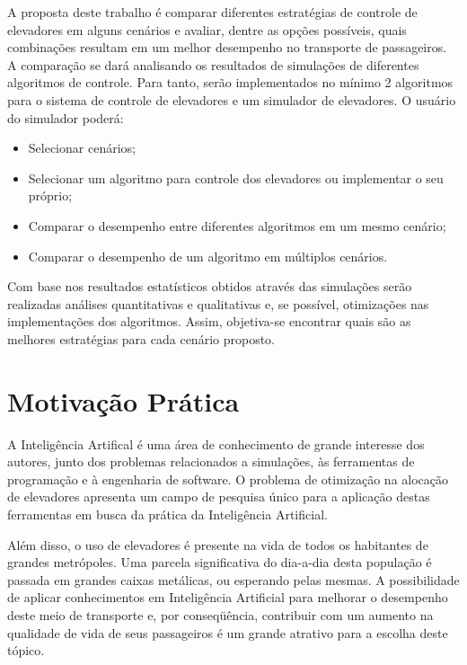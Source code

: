 {\color{red}A proposta deste trabalho é comparar diferentes estratégias de controle de elevadores em alguns cenários e avaliar, dentre as opções possíveis, quais combinações resultam em um melhor desempenho no transporte de passageiros. A comparação se dará analisando os resultados de simulações de diferentes algoritmos de controle. Para tanto, serão implementados no mínimo 2 algoritmos para o sistema de controle de elevadores e um simulador de elevadores. O usuário do simulador poderá:

\begin{itemize}
  \item Selecionar cenários;
  \item Selecionar um algoritmo para controle dos elevadores ou implementar o seu próprio;
  \item Comparar o desempenho entre diferentes algoritmos em um mesmo cenário;
  \item Comparar o desempenho de um algoritmo em múltiplos cenários.
\end{itemize}

Com base nos resultados estatísticos obtidos através das simulações serão realizadas análises quantitativas e qualitativas e, se possível, otimizações nas implementações dos algoritmos. Assim, objetiva-se encontrar quais são as melhores estratégias para cada cenário proposto.}

\section{Motivação Prática}

A Inteligência Artifical é uma área de conhecimento de grande interesse dos autores, junto dos problemas relacionados a simulações, às ferramentas de programação e à engenharia de software. O problema de otimização na alocação de elevadores apresenta um campo de pesquisa único para a aplicação destas ferramentas em busca da prática da Inteligência Artificial.

Além disso, o uso de elevadores é presente na vida de todos os habitantes de grandes metrópoles. Uma parcela significativa do dia-a-dia desta população é passada em grandes caixas metálicas, ou esperando pelas mesmas. A possibilidade de aplicar conhecimentos em Inteligência Artificial para melhorar o desempenho deste meio de transporte e, por conseqüência, contribuir com um aumento na qualidade de vida de seus passageiros é um grande atrativo para a escolha deste tópico.

